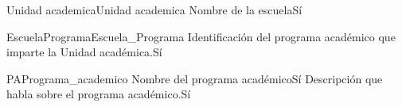 \newpage
\begin{cdtEntidad}{Unidad academica}{Unidad academica}
	{Nombre de la escuela}{Sí}
\end{cdtEntidad}
\begin{cdtEntidad}{EscuelaPrograma}{Escuela\_Programa}
	{Identificación del programa académico que imparte la Unidad académica.}{Sí}
\end{cdtEntidad}
\begin{cdtEntidad}{PA}{Programa\_academico}
	{Nombre del programa académico}{Sí}
	{Descripción que habla sobre el programa académico.}{Sí}
\end{cdtEntidad}
